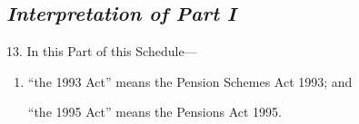 \documentclass[12pt,a4paper]{article}
\begin{document}

\subsection*{\itshape Interpretation of Part I}

13. In this Part of this Schedule—
\begin{enumerate}\item[]
    “the 1993 Act” means the Pension Schemes Act 1993; and

    “the 1995 Act” means the Pensions Act 1995.  
\end{enumerate}

%

\end{document}
